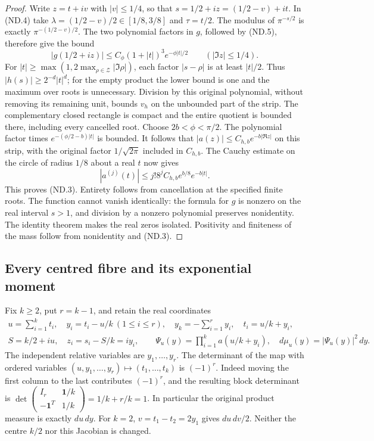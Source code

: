 \begin{proof}
Write \(z=t+iv\) with \(|v|\le1/4\), so that
\(s=1/2+iz=(1/2-v)+it\). In (ND.4) take
\(\lambda=(1/2-v)/2\in[1/8,3/8]\) and \(\tau=t/2\).
The modulus of \(\pi^{-s/2}\) is exactly \(\pi^{-(1/2-v)/2}\).
The two polynomial factors in \(g\), followed by (ND.5), therefore
give the bound
\[
 |g(1/2+iz)|\le C_\phi(1+|t|)^3 e^{-\phi|t|/2}
       \qquad(|\Im z|\le1/4).
 \tag{ND.6}
\]
For \(|t|\ge\max(1,2\max_{\rho\in\mathcal Z}|\Im\rho|)\),
each factor \(|s-\rho|\) is at least \(|t|/2\). Thus
\(|h(s)|\ge2^{-d}|t|^d\); for the empty product the lower bound
is one and the maximum over roots is unnecessary. Division by this
original polynomial, without removing its remaining unit, bounds
\(v_h\) on the unbounded part of the strip. The complementary
closed rectangle is compact and the entire quotient is bounded there,
including every cancelled root. Choose \(2b<\phi<\pi/2\).
The polynomial factor times \(e^{-(\phi/2-b)|t|}\) is bounded.
It follows that
\(|a(z)|\le C_{h,b}e^{-b|\Re z|}\) on this strip, with the
original factor \(1/\sqrt{2\pi}\) included in \(C_{h,b}\).
The Cauchy estimate on the circle of radius \(1/8\) about a real
\(t\) now gives
\[
 |a^{(j)}(t)|\le j!8^j C_{h,b}e^{b/8}e^{-b|t|}.
\]
This proves (ND.3). Entirety follows from cancellation at the specified
finite roots. The function cannot vanish identically: the formula for
\(g\) is nonzero on the real interval \(s>1\), and division by a
nonzero polynomial preserves nonidentity. The identity theorem makes
the real zeros isolated. Positivity and finiteness of the mass follow
from nonidentity and (ND.3).
\end{proof}

\subsection{Every centred fibre and its exponential moment}

Fix \(k\ge2\), put \(r=k-1\), and retain the real coordinates
\[
 \begin{gathered}
 u=\sum_{i=1}^k t_i,\quad y_i=t_i-u/k\ (1\le i\le r),\quad
 y_k=-\sum_{i=1}^r y_i,\quad t_i=u/k+y_i,\\
 S=k/2+iu,\quad z_i=s_i-S/k=iy_i,\qquad
 \Psi_u(y)=\prod_{i=1}^k a(u/k+y_i),\quad
 d\mu_u(y)=|\Psi_u(y)|^2\,dy.
 \end{gathered}
 \tag{ND.7}
\]
The independent relative variables are \(y_1,\ldots,y_r\).
The determinant of the map with ordered variables
\((u,y_1,\ldots,y_r)\mapsto(t_1,\ldots,t_k)\) is
\((-1)^r\). Indeed moving the first column to the last contributes
\((-1)^r\), and the resulting block determinant is
\(\det\left(\begin{smallmatrix}I_r&\mathbf1/k\\
-\mathbf1^T&1/k\end{smallmatrix}\right)=1/k+r/k=1\).
In particular the original product measure is exactly \(du\,dy\).
For \(k=2\), \(v=t_1-t_2=2y_1\) gives \(du\,dv/2\).
Neither the centre \(k/2\) nor this Jacobian is changed.

